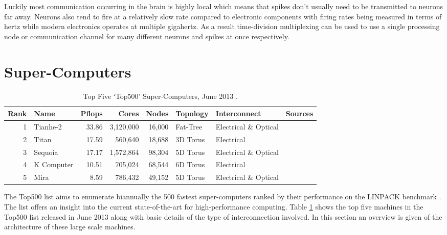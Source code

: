 			Luckily most communication occurring in the brain is highly local which
			means that spikes don't usually need to be transmitted to neurons far
			away. Neurons also tend to fire at a relatively slow rate compared to
			electronic components with firing rates being measured in terms of hertz
			while modern electronics operates at multiple gigahertz. As a result
			time-division multiplexing can be used to use a single processing node or
			communication channel for many different neurons and spikes at once
			respectively.
	
	
	\section{Super-Computers}
		
		\label{sec:super-computers}
		
		\begin{table}
			\center
			\begin{tabular}{r l r r r l l l}
				\toprule
				Rank & Name    & Pflops& Cores  & Nodes  & Topology & Interconnect          & Sources \\
				\midrule                          
				1 & Tianhe-2   & 33.86 & 3,120,000 & 16,000 & Fat-Tree & Electrical \& Optical & \cite{dongarra13} \\
				2 & Titan      & 17.59 & 560,640   & 18,688 & 3D Torus & Electrical            & \cite{bland12} \\
				3 & Sequoia    & 17.17 & 1,572,864 & 98,304 & 5D Torus & Electrical \& Optical & \cite{prickett10} \\
				4 & K Computer & 10.51 & 705,024   & 68,544 & 6D Torus & Electrical            & \cite{fujitsu11,yokokawa11} \\
				5 & Mira       &  8.59 & 786,432   & 49,152 & 5D Torus & Electrical \& Optical & \cite{prickett10} \\
				\bottomrule
			\end{tabular}
			
			\caption{Top Five `Top500' Super-Computers, June 2013 \cite{meuer13}.}
			\label{tab:top500}
		\end{table}
		
		The Top500 list \cite{meuer13} aims to enumerate biannually the 500 fastest
		super-computers ranked by their performance on the LINPACK benchmark
		\cite{dongarraLINPAC}. The list offers an insight into the current
		state-of-the-art for high-performance computing. Table \ref{tab:top500}
		shows the top five machines in the Top500 list released in June 2013 along
		with basic details of the type of interconnection involved. In this section
		an overview is given of the architecture of these large scale machines.
		
